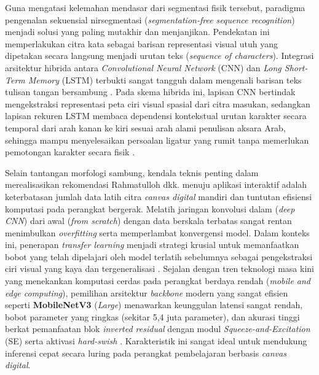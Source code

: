 \documentclass[conference]{IEEEtran}
\begin{document}
Guna mengatasi kelemahan mendasar dari segmentasi fisik tersebut, paradigma pengenalan sekuensial nirsegmentasi (\textit{segmentation-free sequence recognition}) menjadi solusi yang paling mutakhir dan menjanjikan. Pendekatan ini memperlakukan citra kata sebagai barisan representasi visual utuh yang dipetakan secara langsung menjadi urutan teks (\textit{sequence of characters}). Integrasi arsitektur hibrida antara \textit{Convolutional Neural Network} (CNN) dan \textit{Long Short-Term Memory} (LSTM) terbukti sangat tangguh dalam mengenali barisan teks tulisan tangan bersambung \cite{saini2024, peng2024}. Pada skema hibrida ini, lapisan CNN bertindak mengekstraksi representasi peta ciri visual spasial dari citra masukan, sedangkan lapisan rekuren LSTM membaca dependensi kontekstual urutan karakter secara temporal dari arah kanan ke kiri sesuai arah alami penulisan aksara Arab, sehingga mampu menyelesaikan persoalan ligatur yang rumit tanpa memerlukan pemotongan karakter secara fisik \cite{mosbah2024}.

Selain tantangan morfologi sambung, kendala teknis penting dalam merealisasikan rekomendasi Rahmatulloh dkk. \cite{rahmatulloh2022} menuju aplikasi interaktif adalah keterbatasan jumlah data latih citra \textit{canvas digital} mandiri dan tuntutan efisiensi komputasi pada perangkat bergerak. Melatih jaringan konvolusi dalam (\textit{deep CNN}) dari awal (\textit{from scratch}) dengan data berskala terbatas sangat rentan menimbulkan \textit{overfitting} serta memperlambat konvergensi model. Dalam konteks ini, penerapan \textit{transfer learning} menjadi strategi krusial untuk memanfaatkan bobot yang telah dipelajari oleh model terlatih sebelumnya sebagai pengekstraksi ciri visual yang kaya dan tergeneralisasi \cite{lamtougui2024, masruroh2023}. Sejalan dengan tren teknologi masa kini yang menekankan komputasi cerdas pada perangkat berdaya rendah (\textit{mobile and edge computing}), pemilihan arsitektur \textit{backbone} modern yang sangat efisien seperti \textbf{MobileNetV3} (\textit{Large}) menawarkan keunggulan latensi sangat rendah, bobot parameter yang ringkas (sekitar 5,4 juta parameter), dan akurasi tinggi berkat pemanfaatan blok \textit{inverted residual} dengan modul \textit{Squeeze-and-Excitation} (SE) serta aktivasi \textit{hard-swish} \cite{howard2019, elkhayati2025}. Karakteristik ini sangat ideal untuk mendukung inferensi cepat secara luring pada perangkat pembelajaran berbasis \textit{canvas digital}.
\end{document}
